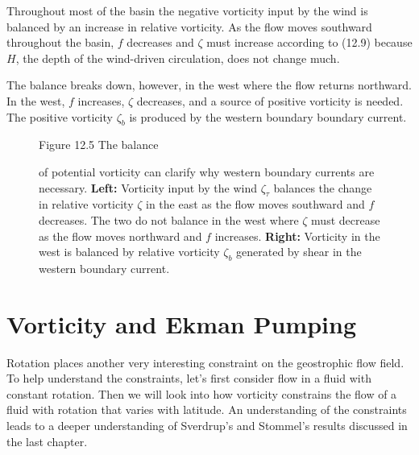 Throughout most of the basin the negative vorticity input by the wind
is balanced by an increase in relative vorticity. As the flow moves
southward throughout the basin, $f$ decreases and $\zeta$ must
increase according to (12.9) because $H$, the depth of the wind-driven
circulation, does not change much.

The balance breaks down, however, in the west where the flow returns
northward. In the west, $f$ increases, $\zeta$ decreases, and a source
of positive vorticity is needed. The positive vorticity $\zeta_{b}$ is
produced by the western boundary boundary current.

\begin{figure}[t!]
\footnotesize
Figure 12.5 The balance \rule{0pt}{4ex}of potential vorticity can
clarify why western boundary currents are necessary.  \textbf{Left:}
Vorticity input by the wind $\zeta_{\tau}$ balances the change in
relative vorticity $\zeta$ in the east as the flow moves southward and
$f$ decreases. The two do not balance in the west where $\zeta$ must
decrease as the flow moves northward and $f$ increases.
\textbf{Right:} Vorticity in the west is balanced by relative
vorticity $\zeta_b$ generated by shear in the western boundary
current.
\label{fig:westbdycurrent}
\vfill
\vspace{-4ex}
\end{figure}

\section{Vorticity and Ekman Pumping}
Rotation places another very interesting
constraint on the geostrophic flow field. To help understand the
constraints, let's first consider flow in a fluid with constant
rotation. Then we will look into how vorticity constrains the flow of
a fluid with rotation that varies with latitude. An understanding of
the constraints leads to a deeper understanding of Sverdrup's and
Stommel's results discussed in the last chapter.


